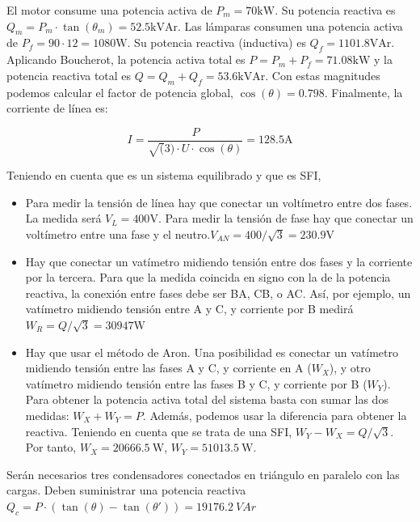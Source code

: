 El motor consume una potencia activa de $P_m = 70\mathrm{kW}$. Su
potencia reactiva es
$Q_m = P_m \cdot \tan(\theta_m) = 52.5\mathrm{kVAr}$.  Las lámparas
consumen una potencia activa de $P_f = 90 \cdot 12 =
1080\mathrm{W}$. Su potencia reactiva (inductiva) es
$Q_f = 1101.8\mathrm{VAr}$.  Aplicando Boucherot, la potencia activa
total es $P = P_m + P_f = 71.08\mathrm{kW}$ y la potencia reactiva
total es $Q = Q_m + Q_f = 53.6\mathrm{kVAr}$. Con estas magnitudes
podemos calcular el factor de potencia global, $\cos(\theta) =
0.798$. Finalmente, la corriente de línea es:

\[
  I = \frac{P}{\sqrt(3) \cdot U \cdot \cos(\theta)} = 128.5\mathrm{A}
\]


Teniendo en cuenta que es un sistema equilibrado y que es SFI,

\begin{itemize}

\item Para medir la tensión de línea hay que conectar un voltímetro
  entre dos fases. La medida será $V_{L} = 400\mathrm{V}$. Para medir
  la tensión de fase hay que conectar un voltímetro entre una fase y
  el neutro.$V_{AN} = 400 / \sqrt{3} = 230.9\mathrm{V}$

\item Hay que conectar un vatímetro midiendo tensión entre dos fases y
  la corriente por la tercera. Para que la medida coincida en signo
  con la de la potencia reactiva, la conexión entre fases debe ser BA,
  CB, o AC. Así, por ejemplo, un vatímetro midiendo tensión entre A y
  C, y corriente por B medirá $W_R = Q / \sqrt{3} = 30947\mathrm{W}$

\item Hay que usar el método de Aron. Una posibilidad es conectar un
  vatímetro midiendo tensión entre las fases A y C, y corriente en A
  ($W_X$), y otro vatímetro midiendo tensión entre las fases B y C, y
  corriente por B ($W_Y$). Para obtener la potencia activa total del
  sistema basta con sumar las dos medidas: $W_{X} + W_{Y} =
  P$. Además, podemos usar la diferencia para obtener la
  reactiva. Teniendo en cuenta que se trata de una SFI,
  $W_Y - W_X = Q/\sqrt{3}$. Por tanto, $W_X = \SI{20666.5}{\watt}$,
  $W_Y = \SI{51013.5}{\watt}$.

\end{itemize}


Serán necesarios tres condensadores conectados en triángulo en
paralelo con las cargas. Deben suministrar una potencia reactiva
$Q_c = P \cdot (\tan(\theta) - \tan(\theta')) = \SI{19176.2}{VAr}$

